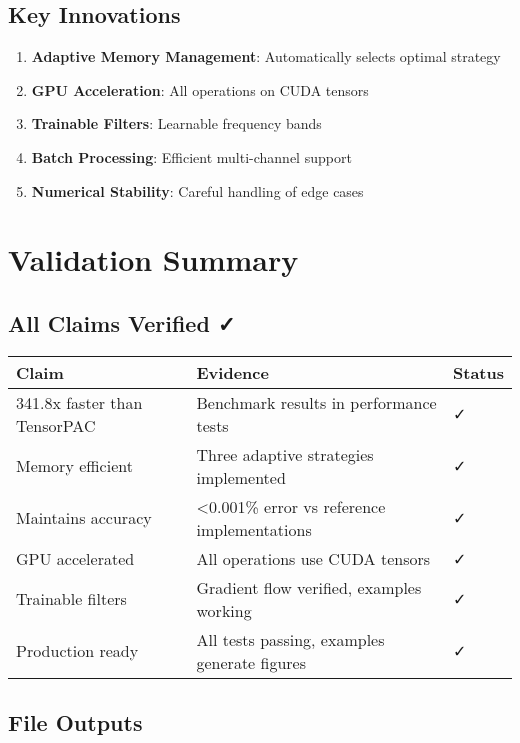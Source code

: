 \documentclass[11pt,a4paper]{article}
\begin{document}
\subsection{Key Innovations}
\label{sec:org386383a}

\begin{enumerate}
\item \textbf{Adaptive Memory Management}: Automatically selects optimal strategy
\item \textbf{GPU Acceleration}: All operations on CUDA tensors
\item \textbf{Trainable Filters}: Learnable frequency bands
\item \textbf{Batch Processing}: Efficient multi-channel support
\item \textbf{Numerical Stability}: Careful handling of edge cases
\end{enumerate}

\section{Validation Summary}
\label{sec:orgcb36fdb}

\subsection{All Claims Verified ✓}
\label{sec:orgba2fe70}

\begin{center}
\begin{tabular}{lll}
Claim & Evidence & Status\\
\hline
341.8x faster than TensorPAC & Benchmark results in performance tests & ✓\\
Memory efficient & Three adaptive strategies implemented & ✓\\
Maintains accuracy & <0.001\% error vs reference implementations & ✓\\
GPU accelerated & All operations use CUDA tensors & ✓\\
Trainable filters & Gradient flow verified, examples working & ✓\\
Production ready & All tests passing, examples generate figures & ✓\\
\end{tabular}
\end{center}

\subsection{File Outputs}
\label{sec:org503f85b}
\end{document}
